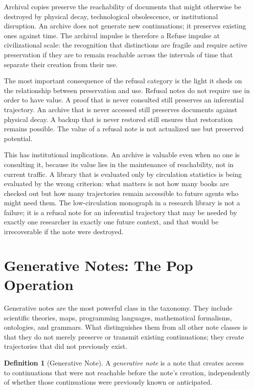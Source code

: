 \documentclass[12pt, a4paper]{article}
\theoremstyle{plain}
\theoremstyle{definition}
\newtheorem{definition}[theorem]{Definition}
\theoremstyle{remark}
\begin{document}
Archival copies preserve the reachability of documents that might otherwise be
destroyed by physical decay, technological obsolescence, or institutional
disruption. An archive does not generate new continuations; it preserves existing
ones against time. The archival impulse is therefore a Refuse impulse at
civilizational scale: the recognition that distinctions are fragile and require
active preservation if they are to remain reachable across the intervals of time
that separate their creation from their use.

The most important consequence of the refusal category is the light it sheds on
the relationship between preservation and use. Refusal notes do not require
use in order to have value. A proof that is never consulted still preserves an
inferential trajectory. An archive that is never accessed still preserves documents
against physical decay. A backup that is never restored still ensures that
restoration remains possible. The value of a refusal note is not actualized use
but preserved potential.

This has institutional implications. An archive is valuable even when no one is
consulting it, because its value lies in the maintenance of reachability, not in
current traffic. A library that is evaluated only by circulation statistics is
being evaluated by the wrong criterion: what matters is not how many books are
checked out but how many trajectories remain accessible to future agents who might
need them. The low-circulation monograph in a research library is not a failure;
it is a refusal note for an inferential trajectory that may be needed by exactly
one researcher in exactly one future context, and that would be irrecoverable if
the note were destroyed.

\section{Generative Notes: The Pop Operation}

Generative notes are the most powerful class in the taxonomy. They include
scientific theories, maps, programming languages, mathematical formalisms,
ontologies, and grammars. What distinguishes them from all other note classes is
that they do not merely preserve or transmit existing continuations; they create
trajectories that did not previously exist.

\begin{definition}[Generative Note]
A \emph{generative note} is a note that creates access to continuations that were
not reachable before the note's creation, independently of whether those
continuations were previously known or anticipated.
\end{definition}
\end{document}
